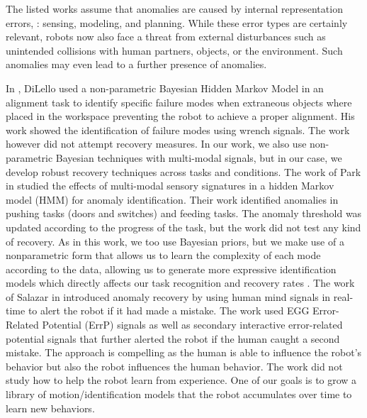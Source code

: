\documentclass[letterpaper, 10 pt, conference]{ieeeconf}  %
\begin{document}
The listed works assume that anomalies are caused by internal representation errors, \ie: sensing, modeling, and planning. While these error types are certainly relevant, robots now also face a threat from external disturbances such as unintended collisions with human partners, objects, or the environment. Such anomalies may even lead to a further presence of anomalies.  

In \cite{2013IROS-DiLello-BayesianContFaultDetection}, DiLello \et used a non-parametric Bayesian Hidden Markov Model in an alignment task to identify specific failure modes when extraneous objects where placed in the workspace preventing the robot to achieve a proper alignment. His work showed the identification of failure modes using wrench signals. The work however did not attempt recovery measures. In our work, we also use non-parametric Bayesian techniques with multi-modal signals, but in our case, we develop robust recovery techniques across tasks and conditions. The work of Park \et in \cite{2016ICRA-Park-MultiModalMonitoringAnomalyDet_RobotManip} studied the effects of multi-modal sensory signatures in a hidden Markov model (HMM) for anomaly identification. Their work identified anomalies in pushing tasks (doors and switches) and feeding tasks. The anomaly threshold was updated according to the progress of the task, but the work did not test any kind of recovery. As in this work, we too use Bayesian priors, but we make use of a nonparametric form that allows us to learn the complexity of each mode according to the data, allowing us to generate more expressive identification models which directly affects our task recognition and recovery rates \cite{2017humanoids-rojas-shdp-var-hmm}. 
The work of Salazar \et in \cite{2017Science-Salazar-Correcting_Robot_Mistakes_in_Real_Time_using_EEG_Signals} introduced anomaly recovery by using human mind signals in real-time to alert the robot if it had made a mistake. The work used EGG Error-Related Potential (ErrP) signals as well as secondary interactive error-related potential signals that further alerted the robot if the human caught a second mistake. The approach is compelling as the human is able to influence the robot's behavior but also the robot influences the human behavior. The work did not study how to help the robot learn from experience. One of our goals is to grow a library of motion/identification models that the robot accumulates over time to learn new behaviors. 
\end{document}
